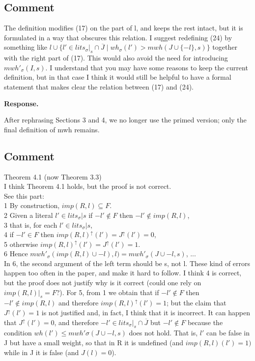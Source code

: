 \documentclass[11pt]{article}
\theoremstyle{definition}
\newcommand{\revieweranswered}{\subsection{Comment}}
\newenvironment{response}{
    \color{blue} \textbf{Response.}
}{
}
\begin{document}
\vspace{0.5cm}

\revieweranswered
The definition modifies (17) on the part of l, and keeps the rest intact,
but it is formulated in a way that obscures this relation.
I suggest redefining (24) by something like
${l} \cup \{ l' \in lits_{\sigma}|_s \cap \overline{J} \mid wh_{\sigma}(l') > mwh(J \cup \{-l\},s)\}$
together with the right part of (17). This would also avoid the need for introducing $mwh'_{\sigma}(I,s)$.
I understand that you may have some reasons to keep the current definition,
but in that case I think it would still be helpful to have a formal statement that makes clear
the relation between (17) and (24).


\begin{response}
After rephrasing Sections 3 and 4, we no longer use the primed version; only the final definition of mwh remains.
\end{response}


\vspace{0.5cm}

 \revieweranswered
Theorem 4.1 (now Theorem 3.3)\\
I think Theorem 4.1 holds, but the proof is not correct.\\
See this part: \\
1 By construction, $imp(R,l) \subseteq F$. \\
2 Given a literal $ l' \in lits_{\sigma}|s $ if $ -l' \not\in F $ then $ -l' \not \in imp(R,l)$, \\
3 that is, for each $l' \in lits_{\sigma}|s$, \\
4 if $-l' \in F $ then $ imp(R,l)^\uparrow(l') = J^\uparrow(l') = 0$, \\
5 otherwise $imp(R,l)^\uparrow(l') = J^\uparrow(l') = 1$. \\
6 Hence $mwh'_{\sigma}(imp(R,l) \cup -l),l) = mwh'_{\sigma}(J \cup -l,s)$, ... \\
In 6, the second argument of the left term should be s, not l.
These kind of errors happen too often in the paper, and make it hard to follow.
I think 4 is correct, but the proof does not justify why is it correct
(could one rely on $imp(R,l)|_s = F$?).
For 5, from 1 we obtain that if
$-l' \not\in F$
then
$-l' \not\in imp(R,l)$
and therefore
$imp(R,l)^\uparrow(l') = 1$;
but the claim that
$J^\uparrow(l') = 1$
is not justified and, in fact, I think that it is incorrect.
It can happen that
$J^\uparrow(l') = 0$,
and therefore
$-l' \in lits_{\sigma}|_s \cap \overline{J}$
but
$-l' \not\in F$
because the condition
$wh(l') \leq mwh'{\sigma}(J \cup -l, s)$
does not hold.
That is, $l'$ can be false in J but have a small weight,
so that in R it is undefined (and $imp(R,l) (l') = 1)$
while in J it is false (and $J(l) = 0$).
\end{document}
